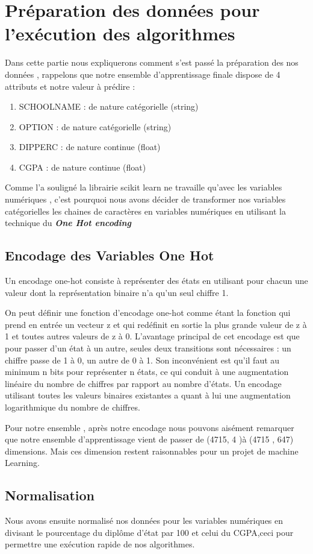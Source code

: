 \section {Préparation des données pour l'exécution des algorithmes } 
Dans cette partie nous expliquerons comment s'est passé la préparation des nos données , rappelons que notre ensemble d'apprentissage finale dispose de 4 attributs et notre valeur à prédire :
\begin{enumerate}
	\item  SCHOOLNAME : de nature catégorielle (string)
	\item  OPTION : de nature catégorielle (string)
	\item  DIPPERC : de nature continue (float)
	\item  CGPA : de nature continue (float)
\end{enumerate}
Comme l'a souligné \cite{OneHotEncoding} la librairie scikit learn ne travaille qu'avec les variables numériques , c'est pourquoi nous avons décider de transformer nos variables catégorielles les chaines de caractères en variables numériques en utilisant la technique du \emph{\textbf{One Hot encoding}} 
\subsection{Encodage des Variables One Hot }
Un encodage one-hot consiste à représenter des états en utilisant pour chacun une valeur dont la représentation binaire n'a qu'un seul chiffre 1.

On peut définir une fonction d'encodage one-hot comme étant la fonction qui prend en entrée un vecteur  z et qui redéfinit en sortie la plus grande valeur de  z à 1 et toutes autres valeurs de  z à 0.
L'avantage principal de cet encodage est que pour passer d'un état à un autre, seules deux transitions sont nécessaires : un chiffre passe de 1 à 0, un autre de 0 à 1. Son inconvénient est qu'il faut au minimum n bits pour représenter n états, ce qui conduit à une augmentation linéaire du nombre de chiffres par rapport au nombre d'états. Un encodage utilisant toutes les valeurs binaires existantes a quant à lui une augmentation logarithmique du nombre de chiffres.

Pour notre ensemble , après notre encodage nous pouvons aisément remarquer que notre ensemble d'apprentissage vient de passer de (4715, 4 )à (4715 , 647)  dimensions.
Mais ces dimension restent raisonnables pour un projet de machine Learning. 
\subsection{Normalisation  } 
Nous avons ensuite normalisé nos données pour les variables numériques en divisant le pourcentage du diplôme d'état par 100 et celui du CGPA,ceci pour permettre une exécution rapide de nos algorithmes. 
